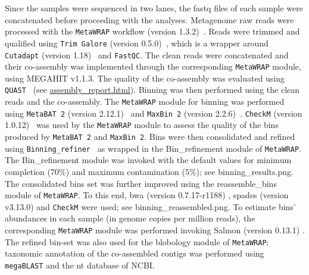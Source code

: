    Since the samples were sequenced in two lanes, the fastq files of each sample were concatenated before proceeding with the analyses. 
   Metagenome raw reads were processed with the \texttt{MetaWRAP} workflow (version 1.3.2)~\citep{uritskiy_metawrapflexible_2018}. 
   Reads were trimmed and qualified using \texttt{Trim Galore} (version 0.5.0)~\citep{krueger_trim_2022}, which is a wrapper around \texttt{Cutadapt} (version 1.18)~\citep{martin_cutadapt_2011} and \texttt{FastQC}. 
   The clean reads were concatenated and their co-assembly was implemented through the corresponding \texttt{MetaWRAP} module, using MEGAHIT v1.1.3. 
   The quality of the co-assembly was evaluated using \texttt{QUAST}~\citep{gurevich_quast_2013} 
   (see \href{https://github.com/hariszaf/karpathos-swamp/blob/main/metaWRAP/assembly_report.html}{assembly\_report.html}). 
   Binning was then performed using the clean reads and the co-assembly. 
   The \texttt{MetaWRAP} module for binning was performed using \texttt{MetaBAT 2} (version 2.12.1)~\citep{kang_metabat_2019} and \texttt{MaxBin 2} (version 2.2.6)~\citep{wu_maxbin_2016}. 
   \texttt{CheckM} (version 1.0.12)~\citep{parks_checkm_2015} was used by the \texttt{MetaWRAP} module to assess the quality of the bins produced by \texttt{MetaBAT 2} and \texttt{MaxBin 2}. 
   Bins were then consolidated and refined using \texttt{Binning\_refiner}~\citep{song2017binning_refiner} as wrapped in the Bin\_refinement module of \texttt{MetaWRAP}. 
   The Bin\_refinement module was invoked with the default values for minimum completion (70\%) and maximum contamination (5\%); 
   see binning\_results.png. 
   The consolidated bins set was further improved using the reassemble\_bins module of \texttt{MetaWRAP}. 
   To this end, bwa (version 0.7.17-r1188) \citep{li_fast_2009}, spades (version v3.13.0) \citep{nurk_metaspades_2017} and \texttt{CheckM} were used; 
   see binning\_reassembled.png. 
   To estimate bins’ abundances in each sample (in genome copies per million reads), the corresponding \texttt{MetaWRAP} module was performed invoking Salmon (version 0.13.1) \citep{patro_salmon_2017}. 
   The refined bin-set was also used for the blobology module of \texttt{MetaWRAP}; 
   taxonomic annotation of the co-assembled contigs was performed using \texttt{megaBLAST} and the nt database of NCBI. 


